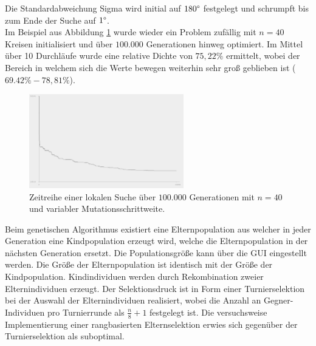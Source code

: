 \documentclass[twoside,bibtotoc]{report}
\begin{document}
Die Standardabweichung Sigma wird initial auf $180\degree$ festgelegt und schrumpft bis zum Ende der Suche auf $1\degree$.\\

Im Beispiel aus Abbildung \ref{fig:hillclimb_variabel} wurde wieder ein Problem zufällig mit $n = 40$ Kreisen initialisiert und über $100.000$ Generationen hinweg optimiert.
Im Mittel über 10 Durchläufe wurde eine relative Dichte von $75,22\%$ ermittelt, wobei der Bereich in welchem sich die Werte bewegen weiterhin sehr groß geblieben ist ($69.42\% - 78,81\%$).

\begin{figure}[h]
 \centering
 \includegraphics [width=0.6\textwidth]{Bilder/Hillclimb_variable.png}
 \caption{
 	Zeitreihe einer lokalen Suche über $100.000$ Generationen mit $n = 40$ und variabler Mutationsschrittweite.
 	}
 \label{fig:hillclimb_variabel}
\end{figure}

\nsecend%

\nsecend%

\nsecend %




Beim genetischen Algorithmus existiert eine Elternpopulation aus welcher in jeder Generation eine Kindpopulation erzeugt wird, welche die Elternpopulation in der nächsten Generation ersetzt.
Die Populationsgröße kann über die \gls{GUI} eingestellt werden.
Die Größe der Elternpopulation ist identisch mit der Größe der Kindpopulation.
Kindindividuen werden durch Rekombination zweier Elternindividuen erzeugt.
Der Selektionsdruck ist in Form einer Turnierselektion bei der Auswahl der Elternindividuen realisiert, wobei die Anzahl an Gegner-Individuen pro Turnierrunde als $\frac{n}{8}+1$ festgelegt ist.
Die versuchsweise Implementierung einer rangbasierten Elternselektion erwies sich gegenüber der Turnierselektion als suboptimal.
\end{document}
